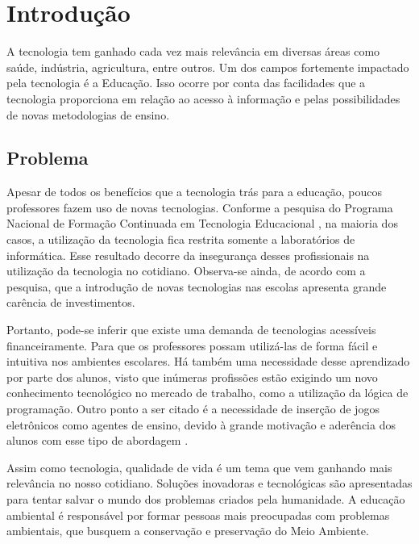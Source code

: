 
\chapter{Introdução}\label{intro}

A tecnologia tem ganhado cada vez mais relevância em diversas áreas como saúde, indústria, agricultura, entre outros. Um dos campos fortemente impactado pela tecnologia é a Educação. Isso ocorre por conta das facilidades que a tecnologia proporciona em relação ao acesso à informação e pelas possibilidades de novas metodologias de ensino. 


\section{Problema}

Apesar de todos os benefícios que a tecnologia trás para a educação, poucos professores fazem uso de novas tecnologias. Conforme a pesquisa do Programa Nacional de Formação Continuada em Tecnologia Educacional \cite{suenia_andre_2012} , na maioria dos casos, a utilização da tecnologia fica restrita somente a laboratórios de informática. Esse resultado decorre da insegurança desses profissionais na utilização da tecnologia no cotidiano. Observa-se ainda, de acordo com a pesquisa, que a introdução de novas tecnologias nas escolas apresenta grande carência de investimentos.

Portanto, pode-se inferir que existe uma demanda de tecnologias acessíveis financeiramente. Para que os professores possam utilizá-las de forma fácil e intuitiva nos ambientes escolares. Há também uma necessidade desse aprendizado por parte dos alunos, visto que inúmeras profissões estão exigindo um novo conhecimento tecnológico no mercado de trabalho, como a utilização da lógica de programação. Outro ponto a ser citado é a necessidade de inserção de jogos eletrônicos como agentes de ensino, devido à grande motivação e aderência dos alunos com esse tipo de abordagem \cite{kaue_tatiane_marcos_2017}.

Assim como tecnologia, qualidade de vida é um tema que vem ganhando mais relevância no nosso cotidiano. Soluções inovadoras e tecnológicas são apresentadas para tentar salvar o mundo dos problemas criados pela humanidade. A educação ambiental é responsável por formar pessoas mais preocupadas com problemas ambientais, que busquem a conservação e preservação do Meio Ambiente.

